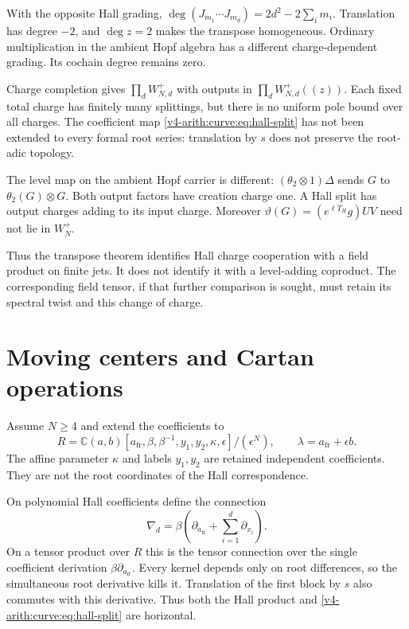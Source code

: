 With the opposite Hall grading,
$\deg(J_{m_1}\cdots J_{m_d})=2d^2-2\sum_i m_i$.
Translation has degree $-2$, and $\deg z=2$ makes the
transpose homogeneous. Ordinary multiplication in the
ambient Hopf algebra has a different charge-dependent
grading. Its cochain degree remains zero.

Charge completion gives $\prod_dW_{N,d}^+$ with outputs in
$\prod_dW_{N,d}^+((z))$. Each fixed total charge has finitely
many splittings, but there is no uniform pole bound over
all charges. The coefficient map
\eqref{v4-arith:curve:eq:hall-split} has not been extended
to every formal root series: translation by $s$ does not
preserve the root-adic topology.

The level map on the ambient Hopf carrier is different:
$(\theta_2\otimes1)\Delta$ sends
$G$ to $\theta_2(G)\otimes G$. Both output factors have
creation charge one. A Hall split has output charges
adding to its input charge. Moreover
$\vartheta(G)=(e^{\ell T_H}g)UV$ need not lie in $W_N^+$.

Thus the transpose theorem identifies Hall charge
cooperation with a field product on finite jets. It
does not identify it with a level-adding coproduct.
The corresponding field tensor, if that further comparison
is sought, must retain its spectral twist and this change
of charge.

\section{Moving centers and Cartan operations}
\label{v4-arith:curve:sec:moving-center}

Assume $N\geq4$ and extend the coefficients to
\[
 R=\mathbb C(a,b)[a_{\mathrm{fr}},\beta,\beta^{-1},
                    y_1,y_2,\kappa,\epsilon]/(\epsilon^N),
 \qquad \lambda=a_{\mathrm{fr}}+\epsilon b .
\]
The affine parameter $\kappa$ and labels $y_1,y_2$ are
retained independent coefficients. They are not the root
coordinates of the Hall correspondence.

On polynomial Hall coefficients define the connection
\begin{equation}\label{v4-arith:curve:eq:moving-connection}
 \nabla_d=\beta\left(\partial_{a_{\mathrm{fr}}}
                         +\sum_{i=1}^d\partial_{x_i}\right).
\end{equation}
On a tensor product over $R$ this is the tensor connection
over the single coefficient derivation
$\beta\partial_{a_{\mathrm{fr}}}$.
Every kernel depends only on root differences, so the
simultaneous root derivative kills it. Translation of the
first block by $s$ also commutes with this derivative.
Thus both the Hall product and
\eqref{v4-arith:curve:eq:hall-split} are horizontal.

